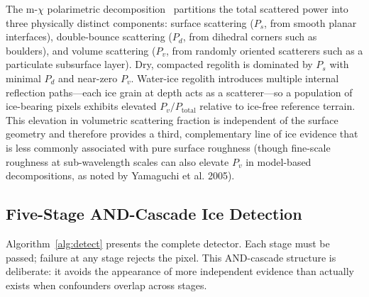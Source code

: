 \documentclass[10pt,conference]{IEEEtran}
\begin{document}
The m-$\chi$ polarimetric decomposition~\cite{raney2012mchi} partitions
the total scattered power into three physically distinct components:
surface scattering ($P_s$, from smooth planar interfaces), double-bounce
scattering ($P_d$, from dihedral corners such as boulders), and volume
scattering ($P_v$, from randomly oriented scatterers such as a particulate
subsurface layer).
Dry, compacted regolith is dominated by $P_s$ with minimal $P_d$ and
near-zero $P_v$.
Water-ice regolith introduces multiple internal reflection paths---each
ice grain at depth acts as a scatterer---so a population of ice-bearing
pixels exhibits elevated $P_v / P_{\mathrm{total}}$ relative to
ice-free reference terrain.
This elevation in volumetric scattering fraction is independent of
the surface geometry and therefore provides a third, complementary
line of ice evidence that is less commonly associated with pure surface roughness (though fine-scale roughness at sub-wavelength scales can also elevate $P_v$ in model-based decompositions, as noted by Yamaguchi et al. 2005).

\subsection{Five-Stage AND-Cascade Ice Detection}
\label{sec:method:icedetect}

Algorithm~\ref{alg:detect} presents the complete detector.
Each stage must be passed; failure at any stage rejects the pixel.
This AND-cascade structure is deliberate: it avoids the appearance of
more independent evidence than actually exists when confounders overlap
across stages.
\end{document}
